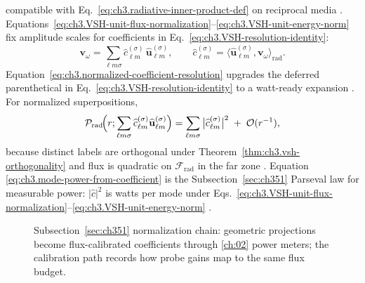 compatible with Eq.~\eqref{eq:ch3.radiative-inner-product-def} on reciprocal media
\cite{stratton1941}. Equations~\eqref{eq:ch3.VSH-unit-flux-normalization}--\eqref{eq:ch3.VSH-unit-energy-norm}
fix amplitude scales for coefficients in Eq.~\eqref{eq:ch3.VSH-resolution-identity}:
\begin{equation}
\label{eq:ch3.normalized-coefficient-resolution}
\mathbf{v}_\omega
=
\sum_{\ell m\sigma}
\widehat{c}_{\ell m}^{(\sigma)}\,\widehat{\mathbf{u}}_{\ell m}^{(\sigma)},
\qquad
\widehat{c}_{\ell m}^{(\sigma)}
=
\big\langle \widehat{\mathbf{u}}_{\ell m}^{(\sigma)},\mathbf{v}_\omega\big\rangle_{\mathrm{rad}}.
\end{equation}
Equation~\eqref{eq:ch3.normalized-coefficient-resolution} upgrades the deferred parenthetical in
Eq.~\eqref{eq:ch3.VSH-resolution-identity} to a watt-ready expansion \cite{hansen1988}.
For normalized superpositions,
\begin{equation}
\label{eq:ch3.mode-power-from-coefficient}
\mathcal{P}_{\mathrm{rad}}\!\Bigl(r;\sum_{\ell m\sigma}\widehat{c}_{\ell m}^{(\sigma)}\widehat{\mathbf{u}}_{\ell m}^{(\sigma)}\Bigr)
=
\sum_{\ell m\sigma}
\big|\widehat{c}_{\ell m}^{(\sigma)}\big|^{2}
\;+\;
\mathcal{O}(r^{-1}),
\end{equation}
because distinct labels are orthogonal under Theorem~\ref{thm:ch3.vsh-orthogonality} and flux is quadratic on
\(\mathcal{F}_{\mathrm{rad}}\) in the far zone \cite{stratton1941}. Equation
\eqref{eq:ch3.mode-power-from-coefficient} is the Subsection~\ref{sec:ch351} Parseval law for measurable power:
\(|\widehat{c}|^{2}\) is watts per mode under Eqs.~\eqref{eq:ch3.VSH-unit-flux-normalization}--\eqref{eq:ch3.VSH-unit-energy-norm}
\cite{harrington2001}.
\begin{figure}[t]
\centering
{}
\caption{Subsection~\ref{sec:ch351} normalization chain: geometric projections become flux-calibrated coefficients through
\ref{ch:02} power meters; the calibration path records how probe gains map to the same flux budget.}
\label{fig:ch3.351-flux-normalization-chain}
\end{figure}
